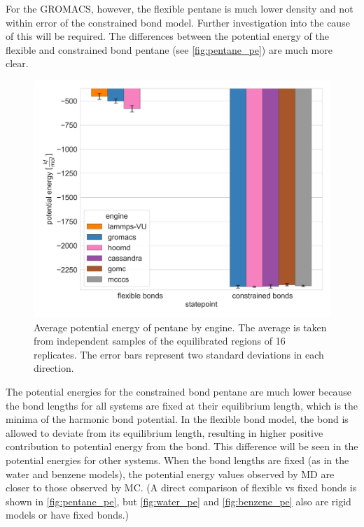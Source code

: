 For the GROMACS, however, the flexible pentane is much lower density and not within error of the constrained bond model.
Further investigation into the cause of this will be required.
The differences between the potential energy of the flexible and constrained bond pentane (see \autoref{fig:pentane_pe}) are much more clear.
\begin{figure}[h!]
    \centering
    \includegraphics[width=0.6\linewidth,keepaspectratio]{figures/rep_study/pentane_pe_summary.png}
    \caption{Average potential energy of pentane by engine. The average is taken from independent samples of the equilibrated regions of 16 replicates. The error bars represent two standard deviations in each direction.}\label{fig:pentane_pe}
\end{figure}
The potential energies for the constrained bond pentane are much lower because the bond lengths for all systems are fixed at their equilibrium length, which is the minima of the harmonic bond potential.
In the flexible bond model, the bond is allowed to deviate from its equilibrium length, resulting in higher positive contribution to potential energy from the bond. 
This difference will be seen in the potential energies for other systems. 
When the bond lengths are fixed (as in the water and benzene models), the potential energy values observed by MD are closer to those observed by MC. 
(A direct comparison of flexible vs fixed bonds is shown in \autoref{fig:pentane_pe}, but \autoref{fig:water_pe} and \autoref{fig:benzene_pe} also are rigid models or have fixed bonds.)

